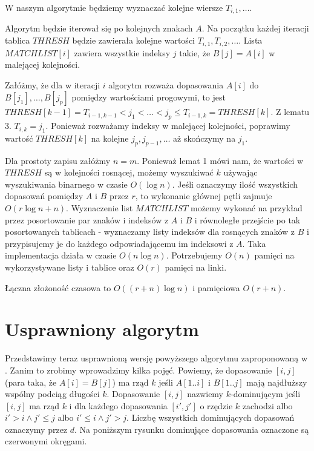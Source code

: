 \documentclass[11pt]{article}
\begin{document}
W naszym algorytmie będziemy wyznaczać kolejne wiersze $T_{i,1}, \dots$.

Algorytm będzie iterował się po kolejnych znakach $A$. Na początku każdej iteracji tablica $THRESH$ będzie zawierała kolejne wartości $T_{i,1}, T_{i,2}, \dots$. Lista $MATCHLIST[i]$ zawiera wszystkie indeksy $j$ takie, że $B[j] = A[i]$ w malejącej kolejności. 

Załóżmy, że dla w iteracji $i$ algorytm rozważa dopasowania $A[i]$ do $B[j_1], \dots, B[j_p]$ pomiędzy wartościami progowymi, to jest $THRESH[k-1] = T_{i-1,k-1} < j_1 < \dots < j_p \le T_{i-1, k} = THRESH[k]$. Z lematu 3. $T_{i,k} = j_1$. Ponieważ rozważamy indeksy w malejącej kolejności, poprawimy wartość $THRESH[k]$ na kolejne $j_p, j_{p-1}, \dots$ aż skończymy na $j_1$.

Dla prostoty zapisu załóżmy $n=m$. Ponieważ lemat 1 mówi nam, że wartości w $THRESH$ są w kolejności rosnącej, możemy wyszukiwać $k$ używając wyszukiwania binarnego w czasie $O(\log{n})$. Jeśli oznaczymy ilość wszystkich dopasowań pomiędzy $A$ i $B$ przez $r$, to wykonanie głównej pętli zajmuje $O(r\log{n} + n)$. Wyznaczenie list $MATCHLIST$ możemy wykonać na przykład przez posortowanie par znaków i indeksów z $A$ i $B$ i równoległe przejście po tak posortowanych tablicach - wyznaczamy listy indeksów dla rosnących znaków z $B$ i przypisujemy je do każdego odpowiadającemu im indeksowi z $A$. Taka implementacja działa w czasie $O(n\log{n})$. Potrzebujemy $O(n)$ pamięci na wykorzystywane listy i tablice oraz $O(r)$ pamięci na linki. 

Łączna złożoność czasowa to $O((r+n)\log{n})$ i pamięciowa $O(r + n)$.

\clearpage

\section*{Usprawniony algorytm}

Przedstawimy teraz usprawnioną wersję powyższego algorytmu zaproponowaną w \cite{apostolico1986improving}. Zanim to zrobimy wprowadzimy kilka pojęć. Powiemy, że dopasowanie $[i,j]$ (para taka, że $A[i] = B[j]$) ma rząd $k$ jeśli $A[1..i]$ i $B[1..j]$ mają najdłuższy wspólny podciąg długości $k$. Dopasowanie $[i, j]$ nazwiemy $k$-dominującym jeśli $[i, j]$ ma rząd $k$ i dla każdego dopasowania $[i', j']$ o rzędzie $k$ zachodzi albo $i' > i \land j' \le j$ albo $i' \le i \land j' > j$. Liczbę wszystkich dominujących dopasowań oznaczymy przez $d$. Na poniższym rysunku dominujące dopasowania oznaczone są czerwonymi okręgami.
\end{document}
